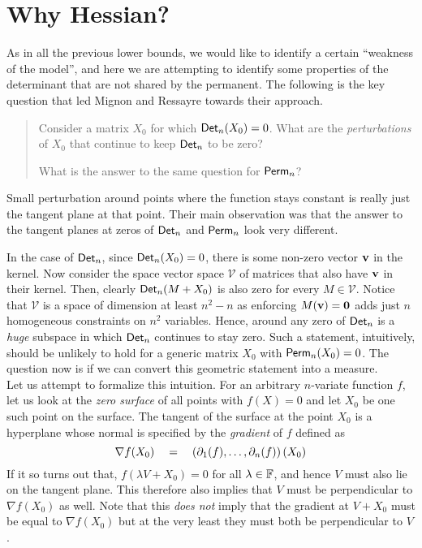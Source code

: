 \section{Why Hessian?}

As in all the previous lower bounds, we would like to identify a certain ``weakness of the model'', and here we are attempting to identify some properties of the determinant that are not shared by the permanent.
The following is the key question that led Mignon and Ressayre towards their approach. 
\begin{quote}
Consider a matrix $X_0$ for which $\operatorname{\mathsf{Det}}_n(X_0) = 0$. What are the \emph{perturbations} of $X_0$ that continue to keep $\operatorname{\mathsf{Det}}_n$ to be zero? 

What is the answer to the same question for $\operatorname{\mathsf{Perm}}_n$?
\end{quote}

Small perturbation around points where the function stays constant is really just the tangent plane at that point.
Their main observation was that the answer to the tangent planes at zeros of $\operatorname{\mathsf{Det}}_n$ and $\operatorname{\mathsf{Perm}}_n$ look very different.

In the case of $\operatorname{\mathsf{Det}}_n$, since $\operatorname{\mathsf{Det}}_n(X_0) = 0$, there is some non-zero vector $\mathbf{v}$ in the kernel.
Now consider the space vector space $\mathcal{V}$ of matrices that also have $\mathbf{v}$ in their kernel.
Then, clearly $\operatorname{\mathsf{Det}}_n(M + X_0)$ is also zero for every $M \in \mathcal{V}$.
Notice that $\mathcal{V}$ is a space of dimension at least $n^2 - n$ as enforcing $M(\mathbf{v}) = \mathbf{0}$ adds just $n$ homogeneous constraints on $n^2$ variables.
Hence, around any zero of $\operatorname{\mathsf{Det}}_n$ is a \emph{huge} subspace in which $\operatorname{\mathsf{Det}}_n$ continues to stay zero.
Such a statement, intuitively, should be unlikely to hold for a generic matrix $X_0$ with $\operatorname{\mathsf{Perm}}_n(X_0) = 0$.
The question now is if we can convert this geometric statement into a measure.\\

Let us attempt to formalize this intuition.
For an arbitrary $n$-variate function $f$, let us look at the \emph{zero surface} of all points with $f(X) = 0$ and let $X_0$ be one such point on the surface.
The tangent of the surface at the point $X_0$ is a hyperplane whose normal is specified by the \emph{gradient} of $f$ defined as
\[
\nabla f (X_0) \quad = \quad \left(\partial_{1}(f), \ldots, \partial_{n}(f)\right) (X_0)
\]
If it so turns out that, $f(\lambda V + X_0) = 0$ for all $\lambda \in \mathbb{F}$, and hence $V$ must also lie on the tangent plane.
This therefore also implies that $V$ must be perpendicular to $\nabla f (X_0)$ as well.
Note that this \emph{does not} imply that the gradient at $V + X_0$ must be equal to $\nabla f(X_0)$ but at the very least they must both be perpendicular to $V$. 


